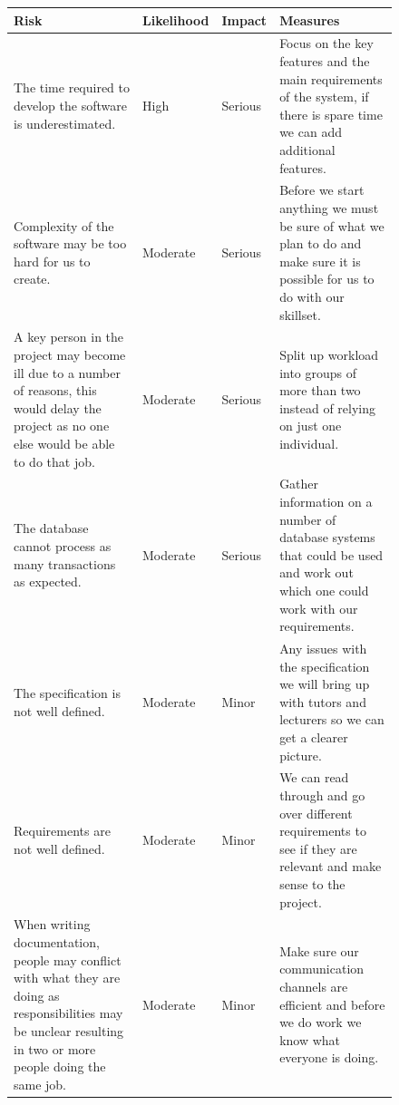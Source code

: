\documentclass[10pt]{report}
\begin{document}
\begin{figure}[!h]

\begin{longtable}{| p{5.5cm} | p{2cm} | p{2cm} |  p{5.5cm} |}
\hline
\textbf{Risk} & \textbf{Likelihood} & \textbf{Impact} & \textbf{Measures} \\
\hline
\endfirsthead

\endlastfoot

\multicolumn{4}{c}{\textit{Continued from last page}}
\endhead

\multicolumn{4}{c}{\textit{Continued on next page}}
\endfoot

The time required to develop the software is underestimated. & 
High & 
Serious & 
Focus on the key features and the main requirements of the system, if there is spare time we can add additional features. \\ 
\hline
Complexity of the software may be too hard for us to create.&
Moderate&
Serious&
Before we start anything we must be sure of what we plan to do and make sure it is possible for us to do with our skillset.\\
\hline

A key person in the project may become ill due to a number of reasons, this would delay the project as no one else would be able to do that job.&
Moderate&
Serious&
Split up workload into groups of more than two instead of relying on just one individual.\\
\hline


The database cannot process as many transactions as expected.& 
Moderate&
Serious&
Gather information on a number of database systems that could be used and work out which one could work with our requirements.\\
\hline

The specification is not well defined.& 
Moderate&
Minor&
Any issues with the specification we will bring up with tutors and lecturers so we can get a clearer picture.\\
\hline


Requirements are not well defined.& 
Moderate&
Minor&
We can read through and go over different requirements to see  if they are relevant and make sense to the project.\\
\hline

When writing documentation, people may conflict with what they are doing as responsibilities may be unclear resulting in two or more people doing the same job.& 
Moderate&
Minor&
Make sure our communication channels are efficient and before we do work we know what everyone is doing.\\
\hline


\end{longtable}
\end{figure}
\end{document}
